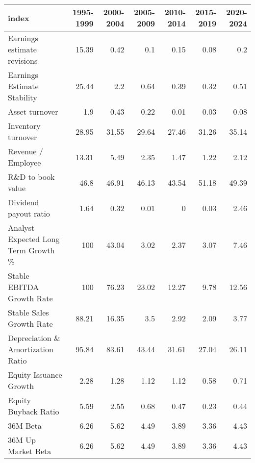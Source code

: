 \begin{tabular}{lrrrrrr}
\hline
 index                               &   1995-1999 &   2000-2004 &   2005-2009 &   2010-2014 &   2015-2019 &   2020-2024 \\
\hline
 Earnings estimate revisions         &       15.39 &        0.42 &        0.1  &        0.15 &        0.08 &        0.2  \\
 Earnings Estimate Stability         &       25.44 &        2.2  &        0.64 &        0.39 &        0.32 &        0.51 \\
 Asset turnover                      &        1.9  &        0.43 &        0.22 &        0.01 &        0.03 &        0.08 \\
 Inventory turnover                  &       28.95 &       31.55 &       29.64 &       27.46 &       31.26 &       35.14 \\
 Revenue / Employee                  &       13.31 &        5.49 &        2.35 &        1.47 &        1.22 &        2.12 \\
 R\&D to book value                   &       46.8  &       46.91 &       46.13 &       43.54 &       51.18 &       49.39 \\
 Dividend payout ratio               &        1.64 &        0.32 &        0.01 &        0    &        0.03 &        2.46 \\
 Analyst Expected Long Term Growth \% &      100    &       43.04 &        3.02 &        2.37 &        3.07 &        7.46 \\
 Stable EBITDA Growth Rate           &      100    &       76.23 &       23.02 &       12.27 &        9.78 &       12.56 \\
 Stable Sales Growth Rate            &       88.21 &       16.35 &        3.5  &        2.92 &        2.09 &        3.77 \\
 Depreciation \& Amortization Ratio   &       95.84 &       83.61 &       43.44 &       31.61 &       27.04 &       26.11 \\
 Equity Issuance Growth              &        2.28 &        1.28 &        1.12 &        1.12 &        0.58 &        0.71 \\
 Equity Buyback Ratio                &        5.59 &        2.55 &        0.68 &        0.47 &        0.23 &        0.44 \\
 36M Beta                            &        6.26 &        5.62 &        4.49 &        3.89 &        3.36 &        4.43 \\
 36M Up Market Beta                  &        6.26 &        5.62 &        4.49 &        3.89 &        3.36 &        4.43 \\

\end{tabular}
